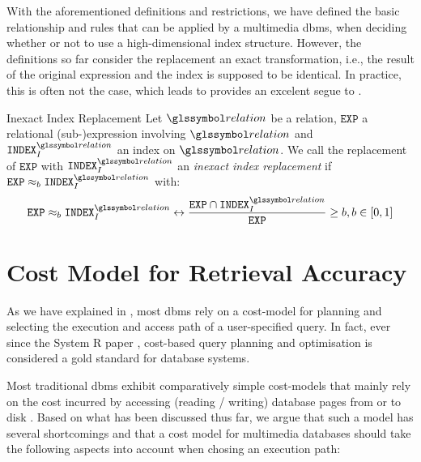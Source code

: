 With the aforementioned definitions and restrictions, we have defined the basic relationship and rules that can be applied by a multimedia \acrshort{dbms}, when deciding whether or not to use a high-dimensional index structure. However, the definitions so far consider the replacement an exact transformation, i.e., the result of the original expression and the index is supposed to be identical. In practice, this is often not the case, which leads to  provides an excelent segue to .

\begin{definition}[label=definition:index_replacement_inexact]{Inexact Index Replacement}{}
    Let $\relation$ be a relation, $\mathtt{EXP}$ a relational (sub-)expression involving $\relation$ and $\mathtt{INDEX}^{\relation}_{I}$ an index on $\relation$. We call the replacement of $\mathtt{EXP}$ with $\mathtt{INDEX}^{\relation}_{I}$ an \emph{inexact index replacement} if $\mathtt{EXP} \approx_{b} \mathtt{INDEX}^{\relation}_{I}$ with:
    \begin{equation*}
        \mathtt{EXP} \approx_{b} \mathtt{INDEX}^{\relation}_{I} \leftrightarrow \frac{\mathtt{EXP} \cap \mathtt{INDEX}^{\relation}_{I}}{\mathtt{EXP}} \geq b, b \in [0, 1]
    \end{equation*}
\end{definition}  

\section{Cost Model for Retrieval Accuracy}
\label{section:cost_model}

As we have explained in , most \acrshort{dbms} rely on a cost-model for planning and selecting the execution and access path of a user-specified query. In fact, ever since the System R paper \cite{Selinger:1979Access}, cost-based query planning and optimisation is considered a gold standard for database systems.

Most traditional \acrshort{dbms} exhibit comparatively simple cost-models that mainly rely on the cost incurred by accessing (reading / writing) database pages from or to disk . Based on what has been discussed thus far, we argue that such a model has several shortcomings and that a cost model for multimedia databases should take the following aspects into account when chosing an execution path:


